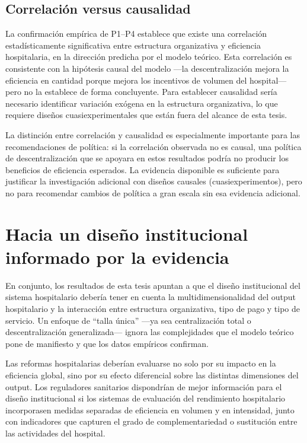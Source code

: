 \documentclass[12pt, a4paper, twoside, openright]{book}
\theoremstyle{plain}
\theoremstyle{definition}
\theoremstyle{remark}
\begin{document}
\subsection{Correlación versus causalidad}

La confirmación empírica de P1--P4 establece que existe una correlación estadísticamente significativa entre estructura organizativa y eficiencia hospitalaria, en la dirección predicha por el modelo teórico. Esta correlación es consistente con la hipótesis causal del modelo ---la descentralización mejora la eficiencia en cantidad porque mejora los incentivos de volumen del hospital--- pero no la establece de forma concluyente. Para establecer causalidad sería necesario identificar variación exógena en la estructura organizativa, lo que requiere diseños cuasiexperimentales que están fuera del alcance de esta tesis.

La distinción entre correlación y causalidad es especialmente importante para las recomendaciones de política: si la correlación observada no es causal, una política de descentralización que se apoyara en estos resultados podría no producir los beneficios de eficiencia esperados. La evidencia disponible es suficiente para justificar la investigación adicional con diseños causales (cuasiexperimentos), pero no para recomendar cambios de política a gran escala sin esa evidencia adicional.

\section{Hacia un diseño institucional informado por la evidencia}

En conjunto, los resultados de esta tesis apuntan a que el diseño institucional del sistema hospitalario debería tener en cuenta la multidimensionalidad del output hospitalario y la interacción entre estructura organizativa, tipo de pago y tipo de servicio. Un enfoque de ``talla única'' ---ya sea centralización total o descentralización generalizada--- ignora las complejidades que el modelo teórico pone de manifiesto y que los datos empíricos confirman.

Las reformas hospitalarias deberían evaluarse no solo por su impacto en la eficiencia global, sino por su efecto diferencial sobre las distintas dimensiones del output. Los reguladores sanitarios dispondrían de mejor información para el diseño institucional si los sistemas de evaluación del rendimiento hospitalario incorporasen medidas separadas de eficiencia en volumen y en intensidad, junto con indicadores que capturen el grado de complementariedad o sustitución entre las actividades del hospital.
\end{document}

